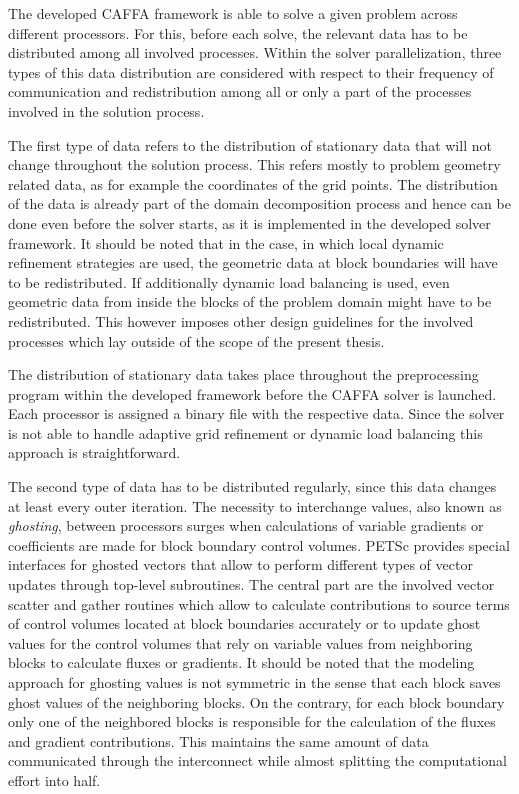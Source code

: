 The developed CAFFA framework is able to solve a given problem across different processors. For this, before each solve, the relevant data has to be distributed among all involved processes. Within the solver parallelization, three types of this data distribution are considered with respect to their frequency of communication and redistribution among all or only a part of the processes involved in the solution process. 

The first type of data refers to the distribution of stationary data that will not change throughout the solution process. This refers mostly to problem geometry related data, as for example the coordinates of the grid points. The distribution of the data is already part of the domain decomposition process and hence can be done even before the solver starts, as it is implemented in the developed solver framework. It should be noted that in the case, in which local dynamic refinement strategies are used, the geometric data at block boundaries will have to be redistributed. If additionally dynamic load balancing is used, even geometric data from inside the blocks of the problem domain might have to be redistributed. This however imposes other design guidelines for the involved processes which lay outside of the scope of the present thesis.

The distribution of stationary data takes place throughout the preprocessing program within the developed framework before the CAFFA solver is launched. Each processor is assigned a binary file with the respective data. Since the solver is not able to handle adaptive grid refinement or dynamic load balancing this approach is straightforward.

The second type of data has to be distributed regularly, since this data changes at least every outer iteration. The necessity to interchange values, also known as \emph{ghosting}, between processors surges when calculations of variable gradients or coefficients are made for block boundary control volumes. PETSc provides special interfaces for ghosted vectors that allow to perform different types of vector updates through top-level subroutines. The central part are the involved vector scatter and gather routines which allow to calculate contributions to source terms of control volumes located at block boundaries accurately or to update ghost values for the control volumes that rely on variable values from neighboring blocks to calculate fluxes or gradients. It should be noted that the modeling approach for ghosting values is not symmetric in the sense that each block saves ghost values of the neighboring blocks. On the contrary, for each block boundary only one of the neighbored blocks is responsible for the calculation of the fluxes and gradient contributions. This maintains the same amount of data communicated through the interconnect while almost splitting the computational effort into half.

